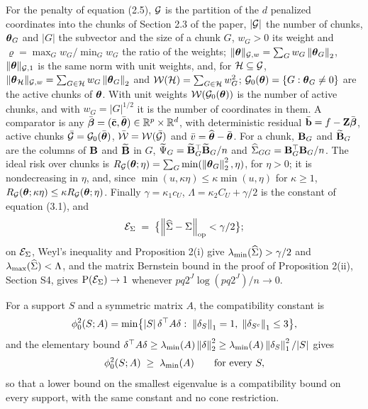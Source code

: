 For the penalty of equation (2.5), $\mathcal{G}$ is the partition of the $d$
penalized coordinates into the chunks of Section 2.3 of the paper, $|\mathcal{G}|$
the number of chunks, $\boldsymbol{\theta}_{G}$ and $|G|$ the subvector and the size of a
chunk $G$, $w_{G} > 0$ its weight and $\varrho = \max_{G}w_{G}/\min_{G}w_{G}$
the ratio of the weights; $\lVert \boldsymbol{\theta}\rVert_{\mathcal{G},w} = \sum_{G}w_{G}\left\lVert \boldsymbol{\theta}_{G} \right\rVert_{2}$,
$\lVert \boldsymbol{\theta}\rVert_{\mathcal{G},1}$ is the same norm with unit weights, and, for
$\mathcal{H} \subseteq \mathcal{G}$, $\lVert \boldsymbol{\theta}_{\mathcal{H}}\rVert_{\mathcal{G},w} =
\sum_{G\in\mathcal{H}}w_{G}\left\lVert \boldsymbol{\theta}_{G} \right\rVert_{2}$ and
$\mathcal{W}(\mathcal{H}) = \sum_{G\in\mathcal{H}}w_{G}^{2}$; $\mathcal{G}_{0}(\boldsymbol{\theta}) =
\{G : \boldsymbol{\theta}_{G} \ne 0\}$ are the active chunks of $\boldsymbol{\theta}$. With unit
weights $\mathcal{W}(\mathcal{G}_{0}(\boldsymbol{\theta}))$ is the number of active chunks, and with
$w_{G} = |G|^{1/2}$ it is the number of coordinates in them. A comparator is
any $\bar{\boldsymbol{\beta}} = (\bar{\mathbf{c}},\bar{\boldsymbol{\theta}}) \in \mathbb{R}^{p}\times\mathbb{R}^{d}$, with
deterministic residual $\bar{\mathbf{b}} = f - \mathbf{Z}\bar{\boldsymbol{\beta}}$, active chunks
$\bar{\mathcal{G}} = \mathcal{G}_{0}(\bar{\boldsymbol{\theta}})$, $\bar{\mathcal{W}} = \mathcal{W}(\bar{\mathcal{G}})$ and
$\bar{v} = \widehat{\boldsymbol{\theta}} - \bar{\boldsymbol{\theta}}$. For a chunk, $\mathbf{B}_{G}$ and $\widetilde{\mathbf{B}}_{G}$ are the
columns of $\mathbf{B}$ and $\widetilde{\mathbf{B}}$ in $G$, $\widetilde{\Psi}_{G} = \widetilde{\mathbf{B}}_{G}^{\top}\widetilde{\mathbf{B}}_{G}/n$
and $\widehat{\Sigma}_{GG} = \mathbf{B}_{G}^{\top}\mathbf{B}_{G}/n$. The ideal risk over chunks is
$R_{\mathcal{G}}(\boldsymbol{\theta};\eta) = \sum_{G}\min(\left\lVert \boldsymbol{\theta}_{G} \right\rVert_{2}^{2},\eta)$, for
$\eta > 0$; it is nondecreasing in $\eta$, and, since
$\min(u,\kappa\eta) \le \kappa\min(u,\eta)$ for $\kappa \ge 1$,
$R_{\mathcal{G}}(\boldsymbol{\theta};\kappa\eta) \le \kappa R_{\mathcal{G}}(\boldsymbol{\theta};\eta)$. Finally
$\gamma = \kappa_{1}c_{U}$, $\Lambda = \kappa_{2}C_{U} + \gamma/2$ is the
constant of equation (3.1), and
\[
  \mathcal{E}_{\Sigma} \;=\; \bigl\{\left\lVert \widehat{\Sigma} - \Sigma \right\rVert_{\mathrm{op}} < \gamma/2\bigr\};
\]
on $\mathcal{E}_{\Sigma}$, Weyl's inequality and Proposition 2(i) give
$\lambda_{\min}(\widehat{\Sigma}) > \gamma/2$ and $\lambda_{\max}(\widehat{\Sigma}) < \Lambda$, and the matrix
Bernstein bound in the proof of Proposition 2(ii), Section S4, gives
$\mathrm{P}(\mathcal{E}_{\Sigma}) \to 1$ whenever $pq2^{J}\log(pq2^{J})/n \to 0$.


For a support $S$ and a symmetric matrix $A$, the compatibility constant is
\[
  \phi_{0}^2(S;A) = \min\bigl\{|S|\,\delta^{\top} A \delta :\;
  \left\lVert \delta_S \right\rVert_1 = 1,\; \left\lVert \delta_{S^c} \right\rVert_1 \le 3 \bigr\},
\]
and the elementary bound
$\delta^{\top} A\delta \ge \lambda_{\min}(A)\left\lVert \delta \right\rVert_2^2 \ge
\lambda_{\min}(A)\left\lVert \delta_S \right\rVert_1^2/|S|$ gives
\begin{equation}
  \label{eq:compat-lmin}
  \phi_{0}^2(S;A) \;\ge\; \lambda_{\min}(A) \qquad \text{for every } S,
\end{equation}
so that a lower bound on the smallest eigenvalue is a compatibility bound on
every support, with the same constant and no cone restriction.

